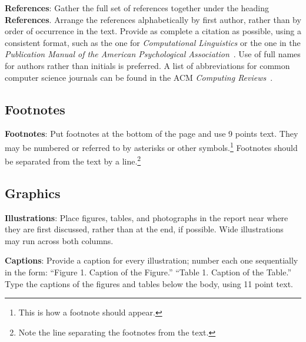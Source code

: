 \documentclass[11pt]{article}
\begin{document}
\textbf{References}: Gather the full set of references together under
the heading {\bf References}. Arrange the references alphabetically
by first author, rather than by order of occurrence in the text.
Provide as complete a citation as possible, using a consistent format,
such as the one for {\em Computational Linguistics\/} or the one in the 
{\em Publication Manual of the American 
Psychological Association\/}~\cite{APA:83}.  Use of full names for
authors rather than initials is preferred.  A list of abbreviations
for common computer science journals can be found in the ACM 
{\em Computing Reviews\/}~\cite{ACM:83}.

\subsection{Footnotes}

{\bf Footnotes}: Put footnotes at the bottom of the page and use 9
points text. They may be numbered or referred to by asterisks or other
symbols.\footnote{This is how a footnote should appear.} Footnotes
should be separated from the text by a line.\footnote{Note the line
separating the footnotes from the text.}

\subsection{Graphics}

{\bf Illustrations}: Place figures, tables, and photographs in the
report near where they are first discussed, rather than at the end, if
possible.  Wide illustrations may run across both columns.

{\bf Captions}: Provide a caption for every illustration; number each one
sequentially in the form:  ``Figure 1. Caption of the Figure.'' ``Table 1.
Caption of the Table.''  Type the captions of the figures and 
tables below the body, using 11 point text.
\end{document}
